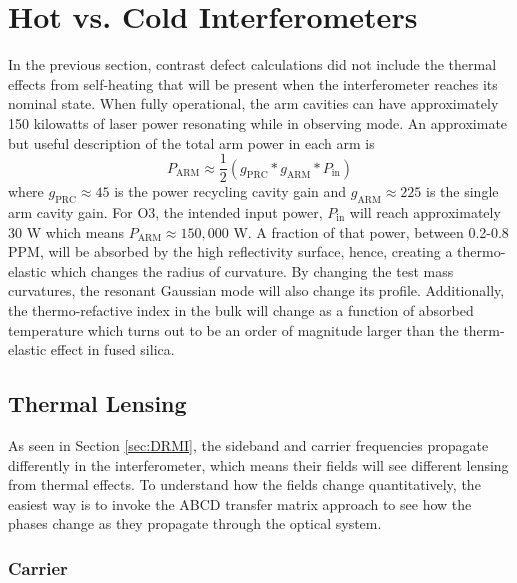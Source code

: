 	\section{Hot vs. Cold Interferometers}\label{sec:hotcoldifo}
	In the previous section, contrast defect calculations did not include the thermal effects from self-heating that will be present when the interferometer reaches its nominal state.  When fully operational, the arm cavities can have approximately 150 kilowatts of laser power resonating while in observing mode. An approximate but useful description of the total arm power in each arm is
	\begin{equation}
		P_{\text{ARM}} \approx \frac{1}{2} (g_{\text{PRC}} * g_{\text{ARM}} * P_{\text{in}})
	\end{equation}
	where $g_{\text{PRC}} \approx 45$ is the power recycling cavity gain and $g_{\text{ARM}} \approx 225$ is the single arm cavity gain. For O3, the intended input power, $P_{\text{in}}$ will reach approximately 30 W which means $P_{\text{ARM}} \approx 150,000$ W. A fraction of that power, between 0.2-0.8 PPM, will be absorbed by the high reflectivity surface, hence, creating a thermo-elastic which changes the radius of curvature. By changing the test mass curvatures, the resonant Gaussian mode will also change its profile. Additionally, the thermo-refactive index in the bulk will change as a function of absorbed temperature \cite{winkler_thermaldist} which turns out to be an order of magnitude larger than the therm-elastic effect in fused silica.
	
	\subsection{Thermal Lensing}\label{Sec:TL_lensing}
	\cite{hiro_thermal_lens}
		As seen in Section \ref{sec:DRMI}, the sideband and carrier frequencies propagate differently in the interferometer, which means their fields will see different lensing from thermal effects. To understand how the fields change quantitatively, the easiest way is to invoke the ABCD transfer matrix approach to see how the phases change as they propagate through the optical system.
		\subsubsection{Carrier}
	
